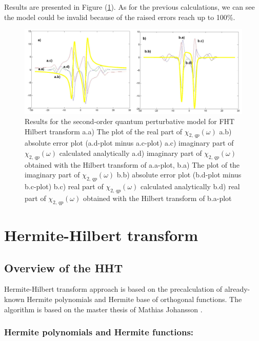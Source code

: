 \documentclass[12pt,twoside,a4paper]{article}
\numberwithin{equation}{subsection}
\numberwithin{figure}{subsection}
\begin{document}
Results are presented in Figure (\ref{fig:fht_qp2}). As for the previous calculations, we can see the model could be invalid
because of the raised errors reach up to 100\%.

\begin{figure} 
  \includegraphics[width=150mm]{img/fht_qp2.png}
  \caption{Results for the second-order quantum perturbative model for FHT Hilbert transform
     a.a) The plot of the real part of $\chi_{2, \, qp}(\omega )$
     a.b) absolute error plot (a.d-plot minus a.c-plot) 
     a.c) imaginary part of $\chi_{2, \, qp}(\omega )$ calculated analytically 
     a.d) imaginary part of $\chi_{2, \, qp}(\omega )$ obtained with the Hilbert transform of a.a-plot, 
     b.a) The plot of the imaginary part of $\chi_{2, \, qp}(\omega )$ 
     b.b) absolute error plot (b.d-plot minus b.c-plot) 
     b.c) real part of $\chi_{2, \, qp} (\omega )$ calculated analytically 
     b.d) real part of $\chi_{2, \, qp} (\omega )$ obtained with the Hilbert transform of b.a-plot 
     \label{fig:fht_qp2}
     }
\end{figure}

\section{Hermite-Hilbert transform} \label{chap:hermite}

\subsection{Overview of the HHT}  \label{chap:hermite_overview}

Hermite-Hilbert transform approach is based on the precalculation of already-known Hermite polynomials and Hermite base of orthogonal
functions. The algorithm is based on the master thesis of Mathias Johansson \cite{johansson_hilbert}.

\subsubsection*{Hermite polynomials and Hermite functions:}
\end{document}
